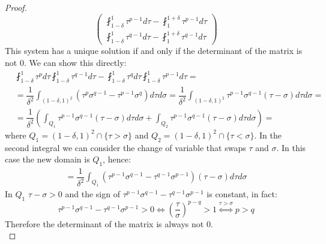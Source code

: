 \documentclass[corpo=11pt, stile=classica, tipotesi=custom,
greek, evenboxes, english]{toptesi}
\numberwithin{equation}{chapter}
\theoremstyle{remark}
\begin{document}
\begin{proof}
\begin{equation}
\begin{pmatrix}
		\fint_{1-\delta}^1 \tau^{p-1} d\tau - \fint_1^{1+\delta} \tau^{p-1} d\tau\\
		\fint_{1-\delta}^1 \tau^{q-1} d\tau - \fint_1^{1+\delta} \tau^{q-1} d\tau
	\end{pmatrix}
\end{equation}
{\color{blue}This system has a unique solution if and only if the determinant of the matrix is not 0. We can show this directly:
\begin{align*}
	& \fint_{1-\delta}^1 \tau^{p} d\tau \fint_{1-\delta}^1 \tau^{q-1} d\tau - \fint_{1-\delta}^1 \tau^{q} d\tau \fint_{1-\delta}^1 \tau^{p-1} d\tau=\\
	&= \dfrac{1}{\delta^2} \int_{(1-\delta,1)^2} \left(\tau^p \sigma^{q-1} - \tau^{p-1}\sigma^q\right) d\tau d\sigma = \dfrac{1}{\delta^2} \int_{(1-\delta,1)^2} \tau^{p-1} \sigma^{q-1} \left( \tau - \sigma \right) d\tau d\sigma = \\
	&= \dfrac{1}{\delta^2} \left( \int_{Q_1} \tau^{p-1} \sigma^{q-1} \left( \tau - \sigma \right) d\tau d\sigma + \int_{Q_2} \tau^{p-1} \sigma^{q-1} \left( \tau - \sigma \right) d\tau d\sigma \right)=
\end{align*}
where $Q_1=(1-\delta,1)^2 \cap \{\tau > \sigma\}$ and $Q_2=(1-\delta,1)^2 \cap \{\tau < \sigma\}$. In the second integral we can consider the change of variable that swaps $\tau$ and $\sigma$. In this case the new domain is $Q_1$, hence:
\begin{align*}
	= \dfrac{1}{\delta^2} \int_{Q_1} \left(\tau^{p-1}\sigma^{q-1} - \tau^{q-1}\sigma^{p-1}\right) \left(\tau - \sigma\right) d\tau d\sigma
\end{align*}
In $Q_1$ $\tau - \sigma > 0$ and the sign of $\tau^{p-1}\sigma^{q-1} - \tau^{q-1}\sigma^{p-1}$ is constant, in fact:
\begin{equation*}
	\tau^{p-1}\sigma^{q-1} - \tau^{q-1}\sigma^{p-1} > 0 \iff \left(\dfrac{\tau}{\sigma}\right)^{p-q} > 1 \overset{\tau > \sigma}{\iff} p>q
\end{equation*}
Therefore the determinant of the matrix is always not 0.}\\

\end{proof}
\end{document}
